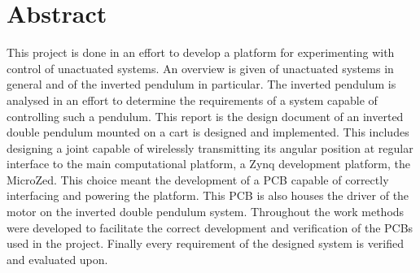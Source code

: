 \section*{Abstract}
This project is done in an effort to develop a platform for experimenting with control of unactuated systems.
An overview is given of unactuated systems in general and of the inverted pendulum in particular.
The inverted pendulum is analysed in an effort to determine the requirements of a system capable of controlling such a pendulum.
This report is the design document of an inverted double pendulum mounted on a cart is designed and implemented.
This includes designing a joint capable of wirelessly transmitting its angular position at regular interface to the main computational platform, a Zynq development platform, the MicroZed.
This choice meant the development of a PCB capable of correctly interfacing and powering the platform.
This PCB is also houses the driver of the motor on the inverted double pendulum system.
Throughout the work methods were developed to facilitate the correct development and verification of the PCBs used in the project.
Finally every requirement of the designed system is verified and evaluated upon.